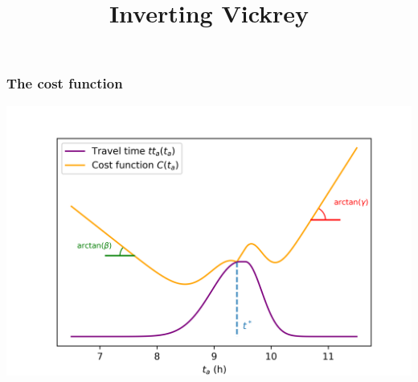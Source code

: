 \documentclass{beamer}
\title{Inverting Vickrey}
\date{}
\begin{document}
\begin{frame}{\titlepage}
  
\end{frame}

\begin{frame}
  \frametitle{The cost function}
  \includegraphics[width=\textwidth]{cost}
\end{frame}
\end{document}
